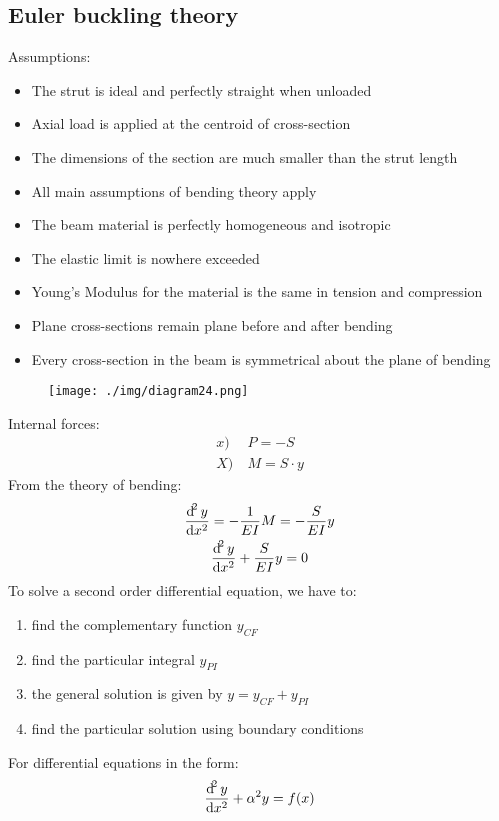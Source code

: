 \subsection{Euler buckling theory}
Assumptions:
\begin{itemize}
  \item The strut is ideal and perfectly straight when unloaded
  \item Axial load is applied at the centroid of cross-section
  \item The dimensions of the section are much smaller than the strut length
  \item All main assumptions of bending theory apply
  \item The beam material is perfectly homogeneous and isotropic
  \item The elastic limit is nowhere exceeded
  \item Young's Modulus for the material is the same in tension and compression
  \item Plane cross-sections remain plane before and after bending
  \item Every cross-section in the beam is symmetrical about the plane of bending
\end{itemize}
\begin{figure}[H]
  \centering
  \texttt{[image: ./img/diagram24.png]}
  \caption{}
\end{figure}
Internal forces:
\begin{align}
  x) & \ P = - S       \\
  X) & \ M = S \cdot y
\end{align}
From the theory of bending:
\begin{gather}
  \frac{\dif^2 y}{\dif x^2} = - \frac{1}{EI}M = -\frac{S}{EI}y\\
  \frac{\dif^2 y}{\dif x^2} + \frac{S}{EI}y = 0
\end{gather}
To solve a second order differential equation, we have to:
\begin{enumerate}
  \item find the complementary function $y_{CF}$
  \item find the particular integral $y_{PI}$
  \item the general solution is given by $y = y_{CF} + y_{PI}$
  \item find the particular solution using boundary conditions
\end{enumerate}
For differential equations in the form:
\begin{equation}
  \frac{\dif^2 y}{\dif x^2}+ \alpha^2 y = f(x)
\end{equation}
